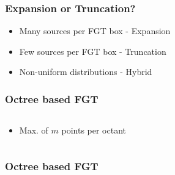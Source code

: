 
\begin{frame}
\frametitle{Expansion or Truncation?}
\begin{itemize}
\item Many sources per FGT box - Expansion
\newline
\item Few sources per FGT box - Truncation
\newline
\item Non-uniform distributions - Hybrid
\end{itemize}
\end{frame}


\begin{frame}
\frametitle{Octree based FGT}
\begin{columns}[T]
\begin{column}{0.4\textwidth}
\begin{itemize}
\item Max. of $m$ points per octant
\end{itemize}
\end{column}
\begin{column}{0.6\textwidth}
 {

}
 {

}
 {

}
\end{column}
\end{columns}
\end{frame}


\begin{frame}
\frametitle{Octree based FGT}
\framesubtitle{}
\end{frame}
